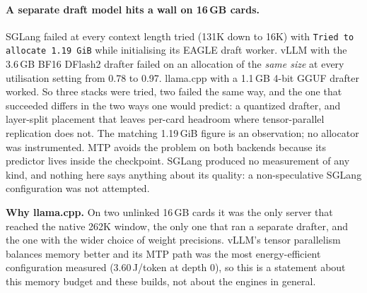 \paragraph{A separate draft model hits a wall on 16\,GB cards.} SGLang failed at every context length
tried (131K down to 16K) with \texttt{Tried to allocate 1.19\,GiB} while initialising its EAGLE draft
worker. vLLM with the 3.6\,GB BF16 DFlash2 drafter failed on an allocation of the \emph{same size} at
every utilisation setting from 0.78 to 0.97. llama.cpp with a 1.1\,GB 4-bit GGUF drafter worked. So
three stacks were tried, two failed the same way, and the one that succeeded differs in the two ways
one would predict: a quantized drafter, and layer-split placement that leaves per-card headroom where
tensor-parallel replication does not. The matching 1.19\,GiB figure is an observation; no allocator
was instrumented. MTP avoids the problem on both backends because its predictor lives inside the
checkpoint. SGLang produced no measurement of any kind, and nothing here says anything about its
quality: a non-speculative SGLang configuration was not attempted.

\begin{takeaway}
\textbf{Why llama.cpp.} On two unlinked 16\,GB cards it was the only server that reached the native
262K window, the only one that ran a separate drafter, and the one with the wider choice of weight
precisions. vLLM's tensor parallelism balances memory better and its MTP path was the most
energy-efficient configuration measured (3.60\,J/token at depth 0), so this is a statement about this
memory budget and these builds, not about the engines in general.
\end{takeaway}
